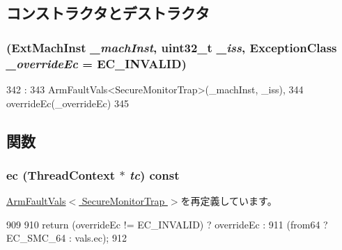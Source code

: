 \subsection{コンストラクタとデストラクタ}
\hypertarget{classArmISA_1_1SecureMonitorTrap_a9d7a16449817dcdbbd07d2c3e59c1309}{
\subsubsection[{SecureMonitorTrap}]{ (ExtMachInst {\em \_\-machInst}, \/  {\bf uint32\_\-t} {\em \_\-iss}, \/  {\bf ExceptionClass} {\em \_\-overrideEc} = {\ttfamily EC\_\-INVALID})}}
\label{classArmISA_1_1SecureMonitorTrap_a9d7a16449817dcdbbd07d2c3e59c1309}



\begin{DoxyCode}
342                                                                :
343         ArmFaultVals<SecureMonitorTrap>(_machInst, _iss),
344         overrideEc(_overrideEc)
345     {}

\end{DoxyCode}


\subsection{関数}
\hypertarget{classArmISA_1_1SecureMonitorTrap_aefab73b22a74d7c48b8a23230906d7cd}{
\subsubsection[{ec}]{ ec ({\bf ThreadContext} $\ast$ {\em tc}) const}}
\label{classArmISA_1_1SecureMonitorTrap_aefab73b22a74d7c48b8a23230906d7cd}


\hyperlink{classArmISA_1_1ArmFaultVals_aa4dd5fb47a1253dbe17e692e905a8c7c}{ArmFaultVals$<$ SecureMonitorTrap $>$}を再定義しています。


\begin{DoxyCode}
909 {
910     return (overrideEc != EC_INVALID) ? overrideEc :
911         (from64 ? EC_SMC_64 : vals.ec);
912 }
\end{DoxyCode}


